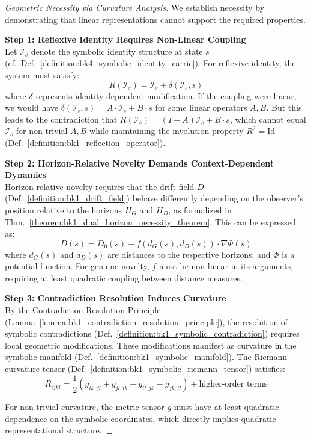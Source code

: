 \begin{proof}[Geometric Necessity via Curvature Analysis]
\label{proof:bk1_geometric_necessity_curvature}
We establish necessity by demonstrating that linear representations cannot support the required properties.

\textbf{Step 1: Reflexive Identity Requires Non-Linear Coupling} \\
Let $\mathcal{I}_s$ denote the symbolic identity structure at state $s$ (cf.~Def.~\ref{definition:bk4_symbolic_identity_carrie}). For reflexive identity, the system must satisfy:
\[
R(\mathcal{I}_s) = \mathcal{I}_s + \delta(\mathcal{I}_s, s)
\]
where $\delta$ represents identity-dependent modification. If the coupling were linear, we would have $\delta(\mathcal{I}_s, s) = A \cdot \mathcal{I}_s + B \cdot s$ for some linear operators $A, B$. But this leads to the contradiction that $R(\mathcal{I}_s) = (I + A)\mathcal{I}_s + B \cdot s$, which cannot equal $\mathcal{I}_s$ for non-trivial $A, B$ while maintaining the involution property $R^2 = \text{Id}$ (Def.~\ref{definition:bk1_reflection_operator}).

\textbf{Step 2: Horizon-Relative Novelty Demands Context-Dependent Dynamics} \\
Horizon-relative novelty requires that the drift field $D$ (Def.~\ref{definition:bk1_drift_field}) behave differently depending on the observer's position relative to the horizons $H_G$ and $H_D$, as formalized in Thm.~\ref{theorem:bk1_dual_horizon_necessity_theorem}. This can be expressed as:
\[
D(s) = D_0(s) + f(d_G(s), d_D(s)) \cdot \nabla \Phi(s)
\]
where $d_G(s)$ and $d_D(s)$ are distances to the respective horizons, and $\Phi$ is a potential function. For genuine novelty, $f$ must be non-linear in its arguments, requiring at least quadratic coupling between distance measures.

\textbf{Step 3: Contradiction Resolution Induces Curvature} \\
By the Contradiction Resolution Principle (Lemma~\ref{lemma:bk1_contradiction_resolution_principle}), the resolution of symbolic contradictions (Def.~\ref{definition:bk1_symbolic_contradiction}) requires local geometric modifications. These modifications manifest as curvature in the symbolic manifold (Def.~\ref{definition:bk1_symbolic_manifold}). The Riemann curvature tensor (Def.~\ref{definition:bk1_symbolic_riemann_tensor}) satisfies:
\[
R_{ijkl} = \frac{1}{2}(g_{ik,jl} + g_{jl,ik} - g_{il,jk} - g_{jk,il}) + \text{higher-order terms}
\]

For non-trivial curvature, the metric tensor $g$ must have at least quadratic dependence on the symbolic coordinates, which directly implies quadratic representational structure.


\end{proof}
